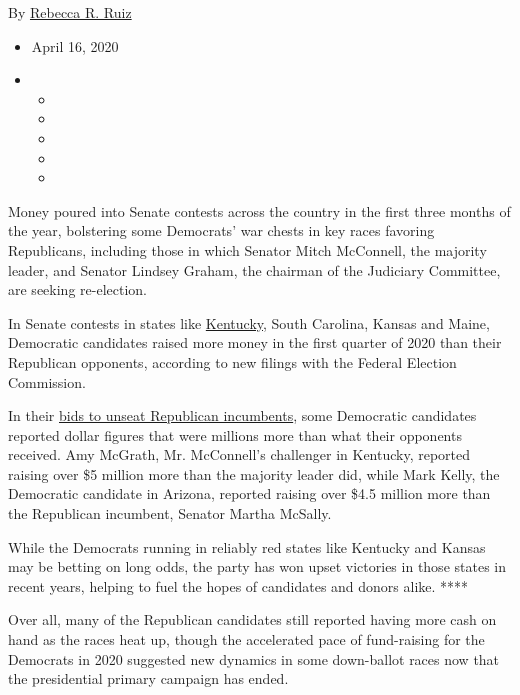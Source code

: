 By \href{https://www.nytimes3xbfgragh.onion/by/rebecca-r-ruiz}{Rebecca
R. Ruiz}

\begin{itemize}
\item
  April 16, 2020
\item
  \begin{itemize}
  \item
  \item
  \item
  \item
  \item
  \end{itemize}
\end{itemize}

Money poured into Senate contests across the country in the first three
months of the year, bolstering some Democrats' war chests in key races
favoring Republicans, including those in which Senator Mitch McConnell,
the majority leader, and Senator Lindsey Graham, the chairman of the
Judiciary Committee, are seeking re-election.

In Senate contests in states like
\href{https://www.nytimes3xbfgragh.onion/2020/06/30/us/politics/election-results-mcgrath-booker-colorado-hickenlooper-romanoff.html}{Kentucky},
South Carolina, Kansas and Maine, Democratic candidates raised more
money in the first quarter of 2020 than their Republican opponents,
according to new filings with the Federal Election Commission.

In their
\href{https://www.nytimes3xbfgragh.onion/2020/06/25/us/politics/trump-senate-republicans-poll.html}{bids
to unseat Republican incumbents}, some Democratic candidates reported
dollar figures that were millions more than what their opponents
received. Amy McGrath, Mr. McConnell's challenger in Kentucky, reported
raising over \$5 million more than the majority leader did, while Mark
Kelly, the Democratic candidate in Arizona, reported raising over \$4.5
million more than the Republican incumbent, Senator Martha McSally.

While the Democrats running in reliably red states like Kentucky and
Kansas may be betting on long odds, the party has won upset victories in
those states in recent years, helping to fuel the hopes of candidates
and donors alike. ****

Over all, many of the Republican candidates still reported having more
cash on hand as the races heat up, though the accelerated pace of
fund-raising for the Democrats in 2020 suggested new dynamics in some
down-ballot races now that the presidential primary campaign has ended.

